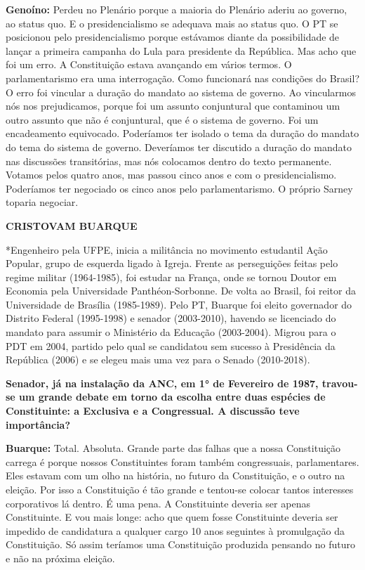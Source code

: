 \textbf{Genoíno:} Perdeu no Plenário porque a maioria do Plenário aderiu
ao governo, ao status quo. E o presidencialismo se adequava mais ao
status quo. O PT se posicionou pelo presidencialismo porque estávamos
diante da possibilidade de lançar a primeira campanha do Lula para
presidente da República. Mas acho que foi um erro. A Constituição estava
avançando em vários termos. O parlamentarismo era uma interrogação. Como
funcionará nas condições do Brasil? O erro foi vincular a duração do
mandato ao sistema de governo. Ao vincularmos nós nos prejudicamos,
porque foi um assunto conjuntural que contaminou um outro assunto que
não é conjuntural, que é o sistema de governo. Foi um encadeamento
equivocado. Poderíamos ter isolado o tema da duração do mandato do tema
do sistema de governo. Deveríamos ter discutido a duração do mandato nas
discussões transitórias, mas nós colocamos dentro do texto permanente.
Votamos pelos quatro anos, mas passou cinco anos e com o
presidencialismo. Poderíamos ter negociado os cinco anos pelo
parlamentarismo. O próprio Sarney toparia negociar.

\textbf{CRISTOVAM BUARQUE}

*Engenheiro pela UFPE, inicia a militância no movimento estudantil Ação
Popular, grupo de esquerda ligado à Igreja. Frente as perseguições
feitas pelo regime militar (1964-1985), foi estudar na França, onde se
tornou Doutor em Economia pela Universidade Panthéon-Sorbonne. De volta
ao Brasil, foi reitor da Universidade de Brasília (1985-1989). Pelo PT,
Buarque foi eleito governador do Distrito Federal (1995-1998) e senador
(2003-2010), havendo se licenciado do mandato para assumir o Ministério
da Educação (2003-2004). Migrou para o PDT em 2004, partido pelo qual se
candidatou sem sucesso à Presidência da República (2006) e se elegeu
mais uma vez para o Senado (2010-2018).

\textbf{Senador, já na instalação da ANC, em 1° de Fevereiro de 1987,
travou-se um grande debate em torno da escolha entre duas espécies de
Constituinte: a Exclusiva e a Congressual. A discussão teve
importância?}

\textbf{Buarque:} Total. Absoluta. Grande parte das falhas que a nossa
Constituição carrega é porque nossos Constituintes foram também
congressuais, parlamentares. Eles estavam com um olho na história, no
futuro da Constituição, e o outro na eleição. Por isso a Constituição é
tão grande e tentou-se colocar tantos interesses corporativos lá dentro.
É uma pena. A Constituinte deveria ser apenas Constituinte. E vou mais
longe: acho que quem fosse Constituinte deveria ser impedido de
candidatura a qualquer cargo 10 anos seguintes à promulgação da
Constituição. Só assim teríamos uma Constituição produzida pensando no
futuro e não na próxima eleição.

